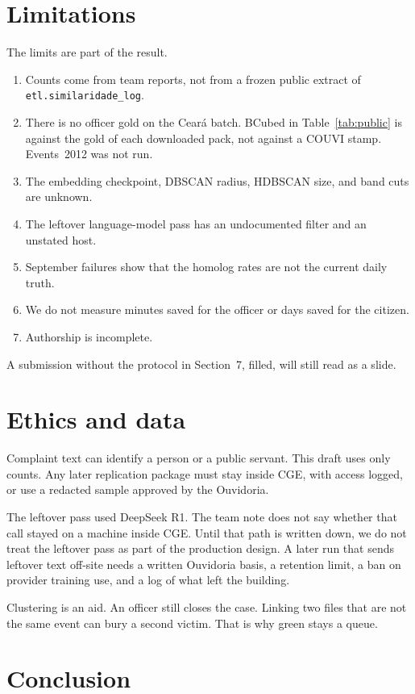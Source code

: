 \documentclass[acmlarge,screen]{acmart}
\begin{document}
\section{Limitations}

The limits are part of the result.
\begin{enumerate}
\item Counts come from team reports, not from a frozen public extract of \texttt{etl.similaridade\_log}.
\item There is no officer gold on the Cear\'{a} batch. BCubed in Table~\ref{tab:public} is against the gold of each downloaded pack, not against a COUVI stamp. Events~2012 was not run.
\item The embedding checkpoint, DBSCAN radius, HDBSCAN size, and band cuts are unknown.
\item The leftover language-model pass has an undocumented filter and an unstated host.
\item September failures show that the homolog rates are not the current daily truth.
\item We do not measure minutes saved for the officer or days saved for the citizen.
\item Authorship is incomplete.
\end{enumerate}

A submission without the protocol in Section~7, filled, will still read as a slide.

\section{Ethics and data}

Complaint text can identify a person or a public servant. This draft uses only counts. Any later replication package must stay inside CGE, with access logged, or use a redacted sample approved by the Ouvidoria.

The leftover pass used DeepSeek R1. The team note does not say whether that call stayed on a machine inside CGE. Until that path is written down, we do not treat the leftover pass as part of the production design. A later run that sends leftover text off-site needs a written Ouvidoria basis, a retention limit, a ban on provider training use, and a log of what left the building.

Clustering is an aid. An officer still closes the case. Linking two files that are not the same event can bury a second victim. That is why green stays a queue.

\section{Conclusion}
\end{document}
